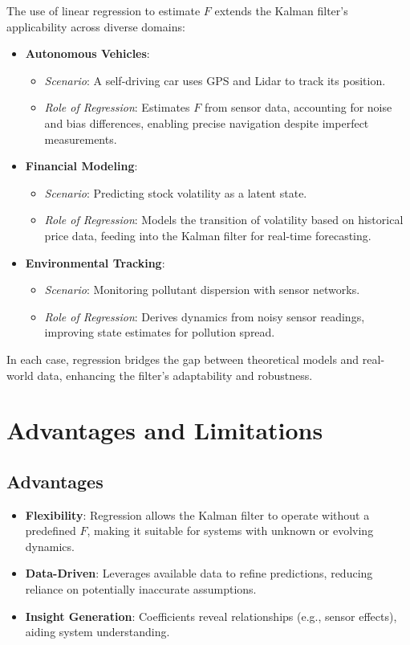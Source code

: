 \documentclass[12pt]{article}
\begin{document}
The use of linear regression to estimate \( F \) extends the Kalman filter’s applicability across diverse domains:
\begin{itemize}
    \item \textbf{Autonomous Vehicles}:
    \begin{itemize}
        \item \textit{Scenario}: A self-driving car uses GPS and Lidar to track its position.
        \item \textit{Role of Regression}: Estimates \( F \) from sensor data, accounting for noise and bias differences, enabling precise navigation despite imperfect measurements.
    \end{itemize}
    \item \textbf{Financial Modeling}:
    \begin{itemize}
        \item \textit{Scenario}: Predicting stock volatility as a latent state.
        \item \textit{Role of Regression}: Models the transition of volatility based on historical price data, feeding into the Kalman filter for real-time forecasting.
    \end{itemize}
    \item \textbf{Environmental Tracking}:
    \begin{itemize}
        \item \textit{Scenario}: Monitoring pollutant dispersion with sensor networks.
        \item \textit{Role of Regression}: Derives dynamics from noisy sensor readings, improving state estimates for pollution spread.
    \end{itemize}
\end{itemize}

In each case, regression bridges the gap between theoretical models and real-world data, enhancing the filter’s adaptability and robustness.

\section{Advantages and Limitations}
\label{sec:advantages-limitations}

\subsection{Advantages}
\begin{itemize}
    \item \textbf{Flexibility}: Regression allows the Kalman filter to operate without a predefined \( F \), making it suitable for systems with unknown or evolving dynamics.
    \item \textbf{Data-Driven}: Leverages available data to refine predictions, reducing reliance on potentially inaccurate assumptions.
    \item \textbf{Insight Generation}: Coefficients reveal relationships (e.g., sensor effects), aiding system understanding.
\end{itemize}
\end{document}
